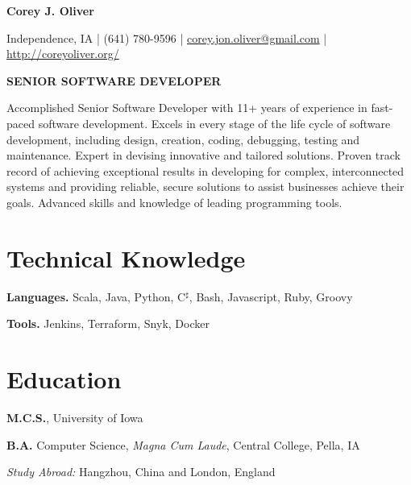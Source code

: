 \documentclass[10pt,letterpaper]{article}
\def\name{Corey J. Oliver}
\renewenvironment{itemize}{
  \begin{list}{}{
      \setlength{\leftmargin}{1.5em}
      \setlength{\itemsep}{0.25em}
      \setlength{\parskip}{0pt}
      \setlength{\parsep}{0.25em}
    }
  }{
  \end{list}
}
\begin{document}

\centerline{\huge \bf \name}

\bigskip

\centerline{Independence, IA | (641) 780-9596 | %
  \href{mailto:corey.jon.oliver@gmail.com}{corey.jon.oliver@gmail.com} |
  \href{http://coreyoliver.org/}{http://coreyoliver.org/}}

\hrulefill{}

\bigskip

\centerline{\bf SENIOR SOFTWARE DEVELOPER}

\bigskip

\noindent
Accomplished Senior Software Developer with 11+ years of experience in
fast-paced software development. Excels in every stage of the life cycle of
software development, including design, creation, coding, debugging, testing and
maintenance. Expert in devising innovative and tailored solutions. Proven track
record of achieving exceptional results in developing for complex,
interconnected systems and providing reliable, secure solutions to assist
businesses achieve their goals. Advanced skills and knowledge of leading
programming tools.

\section*{Technical Knowledge}
\begin{itemize}
  \item \textbf{Languages.} Scala, Java, Python, C$^\sharp$, Bash,
        Javascript, Ruby, Groovy
  \item \textbf{Tools.} Jenkins, Terraform, Snyk, Docker
\end{itemize}

\section*{Education}

\begin{itemize}
  \item \textbf{M.C.S.}, University of Iowa
  \item \textbf{B.A.} Computer Science, \textit{Magna Cum Laude}, Central
        College, Pella, IA
        \begin{itemize}
          \item \textit{Study Abroad:} Hangzhou, China and
                London, England
        \end{itemize}
\end{itemize}
\end{document}
